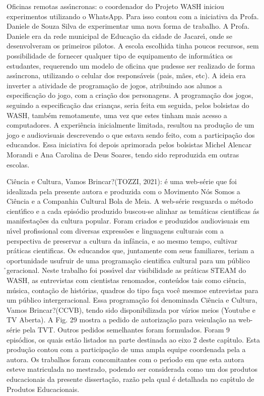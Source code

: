 \documentclass[
12pt,		%
openright,	%
twoside,  %
a4paper,			%
chapter=TITLE,		%
english,			%
french,				%
spanish,			%
brazil				%
]{USPSC-classe/USPSC}
\begin{document}
\begin{alineas}
\item Oficinas remotas ass\'{\i}ncronas: o coordenador do Projeto WASH iniciou experimentos utilizando o WhatsApp. Para isso contou com a iniciativa da Profa. Daniele de Souza Silva de experimentar uma nova forma de trabalho. A Profa. Daniele era da rede municipal de Educa\c{c}\~ao da cidade de Jacare\'{\i}, onde se desenvolveram os primeiros pilotos. A escola escolhida tinha poucos recursos, sem possibilidade de fornecer qualquer tipo de equipamento de inform\'atica os estudantes, requerendo um modelo de oficina que pudesse ser realizado de forma ass\'{\i}ncrona, utilizando o celular dos respons\'aveis (pais, m\~aes, etc). A ideia era inverter a atividade de programa\c{c}\~ao de jogos, atribuindo aos alunos a especifica\c{c}\~ao do jogo, com a cria\c{c}\~ao dos personagens. A programa\c{c}\~ao dos jogos, seguindo a especifica\c{c}\~ao das crian\c{c}as, seria feita em seguida, pelos bolsistas do WASH, tamb\'em remotamente, uma vez que estes tinham mais acesso a computadores. A experi\^encia inicialmente limitada, resultou na produ\c{c}\~ao de um jogo e audiovisuais descrevendo o que estava sendo feito, com a participa\c{c}\~ao dos educandos. Essa iniciativa foi depois aprimorada pelos bolsistas Michel Alencar Morandi e Ana Carolina de Deus Soares, tendo sido reproduzida em outras escolas.
\item \textquotedbl Ci\^encia e Cultura, Vamos Brincar?\textquotedbl   (TOZZI, 2021): \'e uma web-s\'erie que foi idealizada pela  presente autora e produzida com o Movimento N\'os Somos a Ci\^encia e a Companhia Cultural Bola de Meia. A web-s\'erie resguarda o m\'etodo cient\'{\i}fico e a cada epis\'odio produzido buscou-se alinhar as tem\'aticas cientificas \'as manifesta\c{c}\~oes  da cultura popular.  Foram criados e produzidos audiovisuais em n\'{\i}vel profissional com diversas express\~oes e linguagens culturais  com a perspectiva de preservar a cultura da inf\^ancia, e ao mesmo tempo,  cultivar pr\'aticas cientificas.  Os educandos que, juntamente com seus familiares, teriam a oportunidade usufruir de uma programa\c{c}\~ao cientifica cultural para um p\'ublico \r\ninter geracional. Neste trabalho foi poss\'{\i}vel dar visibilidade as pr\'aticas STEAM do WASH,  as entrevistas com cientistas renomados, conte\'udos tais como ci\^encia, m\'usica, conta\c{c}\~ao de hist\'orias, quadros do tipo \textquotedbl fa\c{c}a voc\^e mesmo\textquotedbl  e entrevistas para um p\'ublico intergeracional.  Essa programa\c{c}\~ao foi denominada \textquotedbl Ci\^encia e Cultura, Vamos Brincar?\textquotedbl  (CCVB), tendo sido disponibilizada por v\'arios meios (Youtube e TV Aberta). A Fig. 29 mostra a pedido de autoriza\c{c}\~ao para veicula\c{c}\~ao na web-s\'erie pela TVT. Outros pedidos semelhantes foram formulados. Foram 9 epis\'odios, os quais est\~ao listados na parte destinada ao eixo 2 deste cap\'{\i}tulo. Esta produ\c{c}\~ao contou com a participa\c{c}\~ao de uma ampla equipe coordenada pela a autora. Os trabalhos foram concomitantes com o per\'{\i}odo em que esta autora esteve matriculada no mestrado, podendo ser considerada como um dos produtos educacionais da presente disserta\c{c}\~ao, raz\~ao pela qual \'e detalhada no cap\'{\i}tulo de Produtos Educacionais.

\end{alineas}
\end{document}
